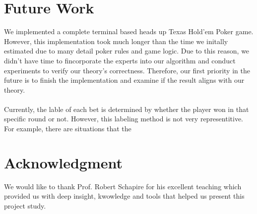 \documentclass[12pt]{article}
\begin{document}
\section{Future Work}
We implemented a complete terminal based heads up Texas Hold'em Poker game. However, this implementation took much longer than the time we initally estimated due to many detail poker rules and game logic. Due to this reason, we didn't have time to fincorporate the experts into our algorithm and conduct experiments to verify our theory's correctness. Therefore, our first priority in the future is to finish the implementation and examine if the result aligns with our theory.
\\
\\
Currently, the lable of each bet is determined by whether the player won in that specific round or not. However, this labeling method is not very representitive. For example, there are situations that the 



\section*{Acknowledgment}
\noindent We would like to thank Prof. Robert Schapire for his excellent teaching which provided us with deep insight, kwowledge and tools that helped us present this project study.



\end{document}
